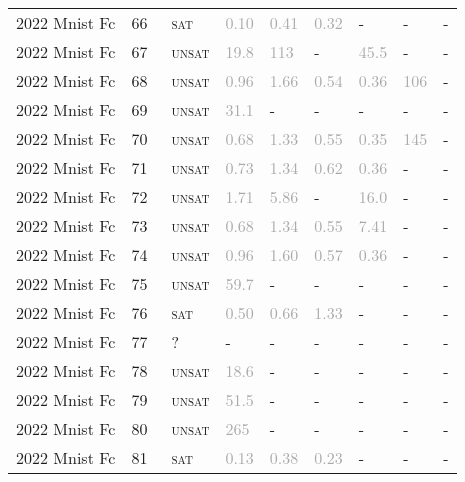 \begin{center}
{\begin{longtable}{@{}lllllllll@{}}
2022 Mnist Fc & 66 & ~\textsc{sat} & \textcolor{darkgray}{0.10} & \textcolor{darkgray}{0.41} & \textcolor{darkgray}{0.32} & - & - & - \\
2022 Mnist Fc & 67 & ~\textsc{unsat} & \textcolor{darkgray}{19.8} & \textcolor{darkgray}{113} & - & \textcolor{darkgray}{45.5} & - & - \\
2022 Mnist Fc & 68 & ~\textsc{unsat} & \textcolor{darkgray}{0.96} & \textcolor{darkgray}{1.66} & \textcolor{darkgray}{0.54} & \textcolor{darkgray}{0.36} & \textcolor{darkgray}{106} & - \\
2022 Mnist Fc & 69 & ~\textsc{unsat} & \textcolor{darkgray}{31.1} & - & - & - & - & - \\
2022 Mnist Fc & 70 & ~\textsc{unsat} & \textcolor{darkgray}{0.68} & \textcolor{darkgray}{1.33} & \textcolor{darkgray}{0.55} & \textcolor{darkgray}{0.35} & \textcolor{darkgray}{145} & - \\
2022 Mnist Fc & 71 & ~\textsc{unsat} & \textcolor{darkgray}{0.73} & \textcolor{darkgray}{1.34} & \textcolor{darkgray}{0.62} & \textcolor{darkgray}{0.36} & - & - \\
2022 Mnist Fc & 72 & ~\textsc{unsat} & \textcolor{darkgray}{1.71} & \textcolor{darkgray}{5.86} & - & \textcolor{darkgray}{16.0} & - & - \\
2022 Mnist Fc & 73 & ~\textsc{unsat} & \textcolor{darkgray}{0.68} & \textcolor{darkgray}{1.34} & \textcolor{darkgray}{0.55} & \textcolor{darkgray}{7.41} & - & - \\
2022 Mnist Fc & 74 & ~\textsc{unsat} & \textcolor{darkgray}{0.96} & \textcolor{darkgray}{1.60} & \textcolor{darkgray}{0.57} & \textcolor{darkgray}{0.36} & - & - \\
2022 Mnist Fc & 75 & ~\textsc{unsat} & \textcolor{darkgray}{59.7} & - & - & - & - & - \\
2022 Mnist Fc & 76 & ~\textsc{sat} & \textcolor{darkgray}{0.50} & \textcolor{darkgray}{0.66} & \textcolor{darkgray}{1.33} & - & - & - \\
2022 Mnist Fc & 77 & ~? & - & - & - & - & - & - \\
2022 Mnist Fc & 78 & ~\textsc{unsat} & \textcolor{darkgray}{18.6} & - & - & - & - & - \\
2022 Mnist Fc & 79 & ~\textsc{unsat} & \textcolor{darkgray}{51.5} & - & - & - & - & - \\
2022 Mnist Fc & 80 & ~\textsc{unsat} & \textcolor{darkgray}{265} & - & - & - & - & - \\
2022 Mnist Fc & 81 & ~\textsc{sat} & \textcolor{darkgray}{0.13} & \textcolor{darkgray}{0.38} & \textcolor{darkgray}{0.23} & - & - & - \\

\end{longtable}}
\end{center}
